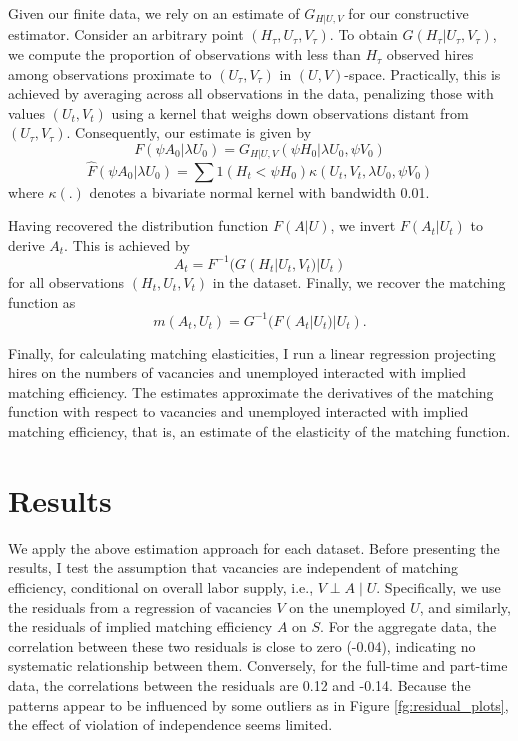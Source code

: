 \documentclass[12pt]{article}
\begin{document}
Given our finite data, we rely on an estimate of $G_{H|U,V}$ for our constructive estimator. Consider an arbitrary point $(H_\tau, U_\tau, V_\tau)$. To obtain $G(H_\tau|U_\tau, V_\tau)$, we compute the proportion of observations with less than $H_\tau$ observed hires among observations proximate to $(U_\tau, V_\tau)$ in $(U, V)$-space. Practically, this is achieved by averaging across all observations in the data, penalizing those with values $(U_t, V_t)$ using a kernel that weighs down observations distant from $(U_\tau, V_\tau)$. Consequently, our estimate is given by
\[
F(\psi A_0|\lambda U_0) = G_{H|U,V}(\psi H_0|\lambda U_0, \psi V_0)
\]
\[
\hat{F}(\psi A_0|\lambda U_0) = \sum 1(H_t < \psi H_0) \kappa(U_t, V_t, \lambda U_0, \psi V_0)
\]
where $\kappa(.)$ denotes a bivariate normal kernel with bandwidth 0.01.

Having recovered the distribution function $F(A|U)$, we invert $F(A_t|U_t)$ to derive $A_t$. This is achieved by
\[
A_t = F^{-1}(G(H_t|U_t, V_t)|U_t)
\]
for all observations $(H_t, U_t, V_t)$ in the dataset. Finally, we recover the matching function as
\[
m(A_t, U_t) = G^{-1}(F(A_t|U_t)|U_t).
\]


Finally, for calculating matching elasticities, I run a linear regression projecting hires on the numbers of vacancies and unemployed interacted with implied matching efficiency.
The estimates approximate the derivatives of the matching function with respect to vacancies and unemployed interacted with implied matching efficiency, that is, an estimate of
the elasticity of the matching function.




\section{Results}
We apply the above estimation approach for each dataset.
Before presenting the results, I test the assumption that vacancies are independent of matching efficiency, conditional on overall labor supply, i.e., \( V \perp A \mid U \). 
Specifically, we use the residuals from a regression of vacancies \( V \) on the unemployed \( U \), and similarly, the residuals of implied matching efficiency \( A \) on \( S \).
For the aggregate data, the correlation between these two residuals is close to zero (-0.04), indicating no systematic relationship between them.
Conversely, for the full-time and part-time data, the correlations between the residuals are 0.12 and -0.14.
Because the patterns appear to be influenced by some outliers as in Figure \ref{fg:residual_plots}, the effect of violation of independence seems limited.
\end{document}
